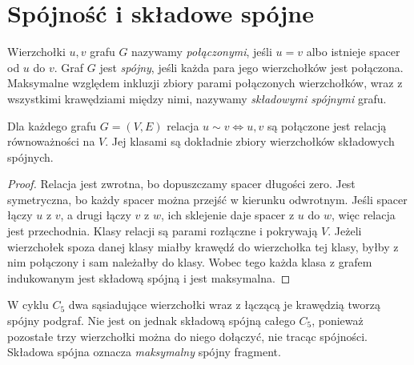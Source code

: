 \section{Spójność i składowe spójne}
\label{sec:tg-spojnosc}

\begin{definicja}[Spójność]
Wierzchołki $u,v$ grafu $G$ nazywamy
\emph{połączonymi}, jeśli $u=v$ albo istnieje
spacer od $u$ do $v$. Graf $G$ jest \emph{spójny},
jeśli każda para jego wierzchołków jest połączona.
Maksymalne względem inkluzji zbiory parami połączonych
wierzchołków, wraz z wszystkimi krawędziami między nimi,
nazywamy \emph{składowymi spójnymi} grafu.
\end{definicja}

\begin{stwierdzenie}
Dla każdego grafu $G=(V,E)$ relacja
$u\sim v\iff u,v$ są połączone jest relacją
równoważności na $V$. Jej klasami są dokładnie
zbiory wierzchołków składowych spójnych.
\end{stwierdzenie}

\begin{proof}
Relacja jest zwrotna, bo dopuszczamy spacer długości zero.
Jest symetryczna, bo każdy spacer można przejść w kierunku
odwrotnym. Jeśli spacer łączy $u$ z $v$, a drugi łączy
$v$ z $w$, ich sklejenie daje spacer z $u$ do $w$,
więc relacja jest przechodnia. Klasy relacji są
parami rozłączne i pokrywają $V$. Jeżeli wierzchołek
spoza danej klasy miałby krawędź do wierzchołka tej klasy,
byłby z nim połączony i sam należałby do klasy. Wobec
tego każda klasa z grafem indukowanym jest składową
spójną i jest maksymalna.
\end{proof}

\begin{przyklad}
W cyklu $C_5$ dwa sąsiadujące wierzchołki wraz z
łączącą je krawędzią tworzą spójny podgraf. Nie jest
on jednak składową spójną całego $C_5$, ponieważ
pozostałe trzy wierzchołki można do niego dołączyć,
nie tracąc spójności. Składowa spójna oznacza
\emph{maksymalny} spójny fragment.
\end{przyklad}

\begin{center}
\end{center}

